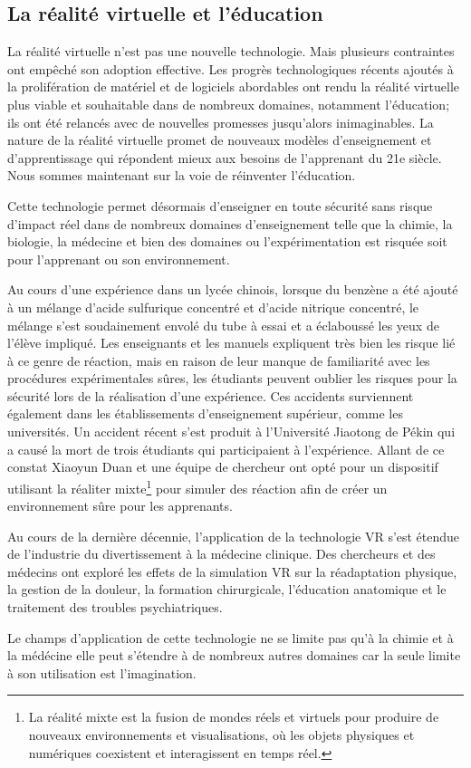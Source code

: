 \subsection{La réalité virtuelle et l'éducation}

La réalité virtuelle n'est pas une nouvelle technologie. Mais plusieurs contraintes ont empêché son adoption effective. Les progrès technologiques récents ajoutés à la prolifération de matériel et de logiciels abordables ont rendu la réalité virtuelle plus viable et souhaitable dans de nombreux domaines, notamment l'éducation; ils ont été relancés avec de nouvelles promesses jusqu'alors inimaginables. La nature de la réalité virtuelle promet de nouveaux modèles d'enseignement et d'apprentissage qui répondent mieux aux besoins de l'apprenant du 21e siècle.
Nous sommes maintenant sur la voie de réinventer l'éducation.

Cette technologie permet désormais d'enseigner en toute sécurité sans risque d'impact réel dans de nombreux domaines d'enseignement telle que la chimie, la biologie, la médecine et bien des domaines ou l'expérimentation est risquée soit pour l'apprenant ou son environnement.

Au cours d'une expérience dans un lycée chinois, lorsque du benzène a été ajouté à un mélange d'acide sulfurique concentré et d'acide nitrique concentré, le mélange s'est soudainement envolé du tube à essai et a éclaboussé les yeux de l'élève impliqué\cite{duan2020mixed}.
Les enseignants et les manuels expliquent très bien les risque lié à ce genre de réaction, mais en raison de leur manque de familiarité avec les procédures expérimentales sûres, les étudiants peuvent oublier les risques pour la sécurité lors de la réalisation d'une expérience\cite{duan2020mixed}.
Ces accidents surviennent également dans les établissements d'enseignement supérieur, comme les universités. Un accident récent s'est produit à l'Université Jiaotong de Pékin qui a causé la mort de trois étudiants qui participaient à l'expérience.
Allant de ce constat Xiaoyun Duan\cite{duan2020mixed} et une équipe de chercheur ont opté pour un dispositif utilisant la réaliter mixte\footnote{La réalité mixte est la fusion de mondes réels et virtuels pour produire de nouveaux environnements et visualisations, où les objets physiques et numériques coexistent et interagissent en temps réel.} pour simuler des réaction afin de créer un environnement sûre pour les apprenants.

Au cours de la dernière décennie, l'application de la technologie VR s'est étendue de l'industrie du divertissement à la médecine clinique. Des chercheurs et des médecins ont exploré les effets de la simulation VR sur la réadaptation physique, la gestion de la douleur, la formation chirurgicale, l'éducation anatomique et le traitement des troubles psychiatriques\cite{li2011virtual, baldominos2015approach, malloy2010effectiveness, alaker2016virtual, yiannakopoulou2015virtual, hackett2016three}.

Le champs d'application de cette technologie ne se limite pas qu'à la chimie et à la médécine elle peut s'étendre à de nombreux autres domaines car la seule limite à son utilisation est l'imagination.